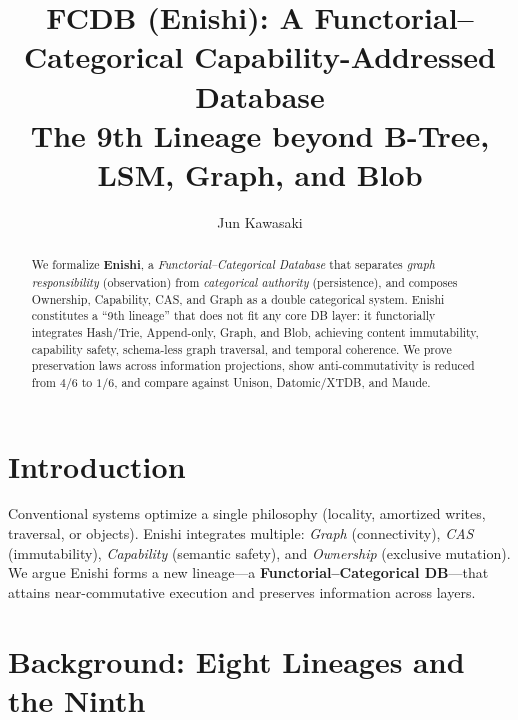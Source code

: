 \documentclass[10pt]{article}
\title{FCDB (Enishi): A Functorial–Categorical Capability-Addressed Database\\
\large The 9th Lineage beyond B-Tree, LSM, Graph, and Blob}
\author{Jun Kawasaki}
\date{}
\begin{document}
\maketitle

\begin{abstract}
We formalize \textbf{Enishi}, a \emph{Functorial--Categorical Database} that separates
\emph{graph responsibility} (observation) from \emph{categorical authority} (persistence),
and composes Ownership, Capability, CAS, and Graph as a double categorical system.
Enishi constitutes a ``9th lineage'' that does not fit any core DB layer: it
functorially integrates Hash/Trie, Append-only, Graph, and Blob, achieving content immutability,
capability safety, schema-less graph traversal, and temporal coherence.
We prove preservation laws across information projections, show anti-commutativity is reduced
from $4/6$ to $1/6$, and compare against Unison, Datomic/XTDB, and Maude.
\end{abstract}

\section{Introduction}
Conventional systems optimize a single philosophy (locality, amortized writes, traversal, or objects).
Enishi integrates multiple: \emph{Graph} (connectivity), \emph{CAS} (immutability), \emph{Capability} (semantic safety),
and \emph{Ownership} (exclusive mutation).
We argue Enishi forms a new lineage---a \textbf{Functorial--Categorical DB}---that attains near-commutative execution
and preserves information across layers.

\section{Background: Eight Lineages and the Ninth}
\end{document}
